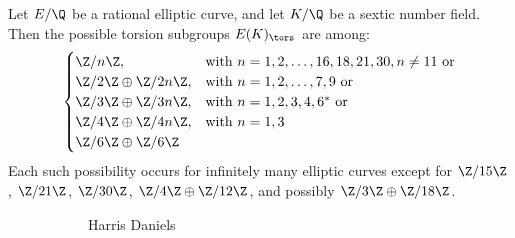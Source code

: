 \begin{frame}[plain]
\footnotesize
\begin{thm}
Let $E/\Q$ be a rational elliptic curve, and let $K/\Q$ be a sextic number field. Then the possible torsion subgroups $E(K)_\tors$ are among:
	\[
	\begin{cases}
	\Z/n\Z, & \text{with } n= 1, 2, \ldots, 16, 18, 21, 30, n \neq 11  \text{ or} \\
	\Z/2\Z \oplus \Z/2n\Z, & \text{with } n= 1, 2, \ldots, 7, 9 \text{ or} \\
	\Z/3\Z \oplus \Z/3n\Z, & \text{with } n= 1, 2, 3, 4, 6^* \text{ or} \\
	\Z/4\Z \oplus \Z/4n\Z, & \text{with } n= 1, 3 \\
	\Z/6\Z \oplus \Z/6\Z 
	\end{cases}
	\]
Each such possibility occurs for infinitely many elliptic curves except for $\Z/15\Z$, $\Z/21\Z$, $\Z/30\Z$, $\Z/4\Z \oplus \Z/12\Z$, and possibly $\Z/3\Z \oplus \Z/18\Z$. 
\end{thm}
	\begin{figure}[h]
	\centering
	\begin{subfigure}{0.30\textwidth}
	\captionsetup{labelformat=empty}
	\centering
	\caption{\tiny Harris Daniels}
	\end{subfigure} 
	\begin{subfigure}{0.30\textwidth}
	\captionsetup{labelformat=empty}
	\centering

\end{subfigure}
\end{figure}
\end{frame}

